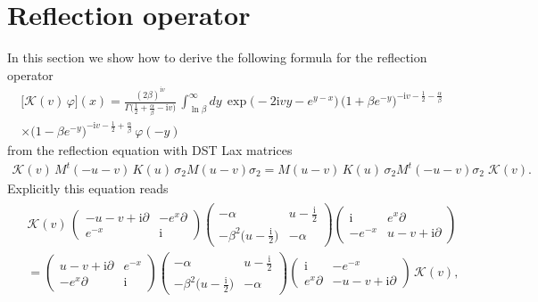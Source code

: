 \documentclass[11pt]{article}
\numberwithin{equation}{section}
\theoremstyle{plain}
\theoremstyle{definition}
\renewcommand{\phi}{\varphi}
\renewcommand{\imath}{\mathrm{i}}
\begin{document}
\section{Reflection operator} \label{sec:refl-op}

In this section we show how to derive the following formula for the reflection operator
\begin{multline}\label{K}
	\bigl[ \mathcal{K} (v) \, \phi \bigr](x) = \frac{(2\beta)^{\imath v}}{\Gamma \bigl( \frac{1}{2} + \frac{\alpha}{\beta} - \imath v \bigr)} \, \int_{\ln \beta}^{\infty} dy \, \exp \bigl(-2 \imath v y - e^{y -x} \bigr) \, \bigl(1 + \beta e^{-y}\bigr)^{- \imath v - \frac{1}{2} - \frac{\alpha}{\beta} } \\
	\times \bigl(1 - \beta e^{-y}\bigr)^{- \imath v - \frac{1}{2} + \frac{\alpha}{\beta}} \, \phi( - y)
\end{multline}
from the reflection equation with DST Lax matrices
\begin{align}\label{KMKM}
\mathcal{K}(v) \, M^t(-u-v) \, K(u) \, \sigma_2 M(u - v) \sigma_2
= M(u - v) \, K(u) \, \sigma_2 M^t(-u -v) \sigma_2 \; \mathcal{K}(v).
\end{align}
Explicitly this equation reads
\begin{align} \label{KMKM-expl}
	\begin{aligned}
		& \mathcal{K}(v) \, \left( 
		\begin{array}{cc}
			-u-v+\imath \partial & -e^{x}\partial \\[4pt]
			e^{-x} & \imath \end{array} \right)
		\left
		(\begin{array}{cc}
			-\alpha & u-\frac{\imath}{2} \\[4pt]
			-\beta^2 \bigl(u-\frac{\imath}{2} \bigr) & -\alpha \end{array} \right )
		\left(\begin{array}{cc}
			\imath & e^{x}\partial \\[4pt]
			-e^{-x} & u-v+\imath \partial \end{array} \right ) \\[6pt]
		& = \left(\begin{array}{cc}
			u-v+\imath \partial & e^{-x} \\[2pt]
			-e^{x}\partial & \imath \end{array} \right )
		\left
		(\begin{array}{cc}
			-\alpha & u-\frac{\imath}{2} \\[4pt]
			-\beta^2 \bigl(u-\frac{\imath}{2} \bigr) & -\alpha \end{array} \right )
		\left(\begin{array}{cc}
			\imath & -e^{-x} \\[4pt]
			e^{x}\partial & -u-v+\imath \partial\end{array} \right )\,\mathcal{K}(v),
	\end{aligned}
\end{align}
\end{document}
